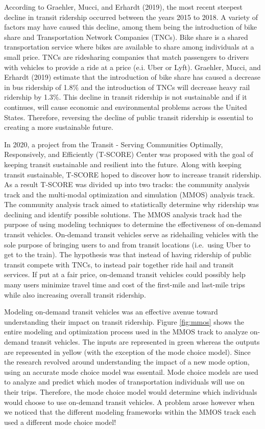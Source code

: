 \documentclass[12pt, oneside, openright]{byuthesis}
\begin{document}
According to Graehler, Mucci, and Erhardt (2019), the most recent steepest decline in transit ridership occurred between the years 2015 to 2018. A variety of factors may have caused this decline, among them being the introduction of bike share and Transportation Network Companies (TNCs). Bike share is a shared transportation service where bikes are available to share among individuals at a small price. TNCs are ridesharing companies that match passengers to drivers with vehicles to provide a ride at a price (e.i. Uber or Lyft). Graehler, Mucci, and Erhardt (2019) estimate that the introduction of bike share has caused a decrease in bus ridership of 1.8\% and the introduction of TNCs will decrease heavy rail ridership by 1.3\%. This decline in transit ridership is not sustainable and if it continues, will cause economic and environmental problems across the United States. Therefore, reversing the decline of public transit ridership is essential to creating a more sustainable future.

In 2020, a project from the Transit - Serving Communities Optimally, Responsively, and Efficiently (T-SCORE) Center was proposed with the goal of keeping transit sustainable and resilient into the future. Along with keeping transit sustainable, T-SCORE hoped to discover how to increase transit ridership. As a result T-SCORE was divided up into two tracks: the community analysis track and the multi-modal optimization and simulation (MMOS) analysis track. The community analysis track aimed to statistically determine why ridership was declining and identify possible solutions. The MMOS analysis track had the purpose of using modeling techniques to determine the effectiveness of on-demand transit vehicles. On-demand transit vehicles serve as ridehailing vehicles with the sole purpose of bringing users to and from transit locations (i.e.~using Uber to get to the train). The hypothesis was that instead of having ridership of public transit compete with TNCs, to instead pair together ride hail and transit services. If put at a fair price, on-demand transit vehicles could possibly help many users minimize travel time and cost of the first-mile and last-mile trips while also increasing overall transit ridership.

Modeling on-demand transit vehicles was an effective avenue toward understanding their impact on transit ridership. Figure \ref{fig:mmos} shows the entire modeling and optimization process used in the MMOS track to analyze on-demand transit vehicles. The inputs are represented in green whereas the outputs are represented in yellow (with the exception of the mode choice model). Since the research revolved around understanding the impact of a new mode option, using an accurate mode choice model was essentail. Mode choice models are used to analyze and predict which modes of transportation individuals will use on their trips. Therefore, the mode choice model would determine which individuals would choose to use on-demand transit vehicles. A problem arose however when we noticed that the different modeling frameworks within the MMOS track each used a different mode choice model!
\end{document}
